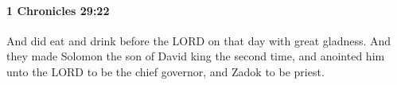 
		\paragraph{1 Chronicles 29:22} %
			\label{1CHRONICLES-29-22}

			And did eat and drink before the LORD on that day with great gladness. And they made Solomon the son of David king the second time, and anointed him unto the LORD to be the chief governor, and Zadok to be priest.


